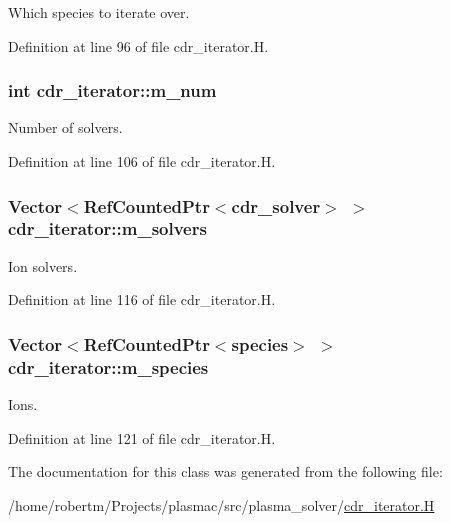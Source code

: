 Which species to iterate over. 



Definition at line 96 of file cdr\+\_\+iterator.\+H.

\subsubsection[{\texorpdfstring{m\+\_\+num}{m_num}}]{\setlength{\rightskip}{0pt plus 5cm}int cdr\+\_\+iterator\+::m\+\_\+num\hspace{0.3cm}{\ttfamily [protected]}}\hypertarget{classcdr__iterator_a466179360a4416fb7507f54fd72e3282}{}\label{classcdr__iterator_a466179360a4416fb7507f54fd72e3282}


Number of solvers. 



Definition at line 106 of file cdr\+\_\+iterator.\+H.

\subsubsection[{\texorpdfstring{m\+\_\+solvers}{m_solvers}}]{\setlength{\rightskip}{0pt plus 5cm}Vector$<$Ref\+Counted\+Ptr$<${\bf cdr\+\_\+solver}$>$ $>$ cdr\+\_\+iterator\+::m\+\_\+solvers\hspace{0.3cm}{\ttfamily [protected]}}\hypertarget{classcdr__iterator_aa57b85ee374ede25d1fc1b0134e83fd0}{}\label{classcdr__iterator_aa57b85ee374ede25d1fc1b0134e83fd0}


Ion solvers. 



Definition at line 116 of file cdr\+\_\+iterator.\+H.

\subsubsection[{\texorpdfstring{m\+\_\+species}{m_species}}]{\setlength{\rightskip}{0pt plus 5cm}Vector$<$Ref\+Counted\+Ptr$<${\bf species}$>$ $>$ cdr\+\_\+iterator\+::m\+\_\+species\hspace{0.3cm}{\ttfamily [protected]}}\hypertarget{classcdr__iterator_ad6674dc863a6cb6c7060e78d10aba336}{}\label{classcdr__iterator_ad6674dc863a6cb6c7060e78d10aba336}


Ions. 



Definition at line 121 of file cdr\+\_\+iterator.\+H.



The documentation for this class was generated from the following file\+:\begin{DoxyCompactItemize}
\item 
/home/robertm/\+Projects/plasmac/src/plasma\+\_\+solver/\hyperlink{cdr__iterator_8H}{cdr\+\_\+iterator.\+H}\end{DoxyCompactItemize}
